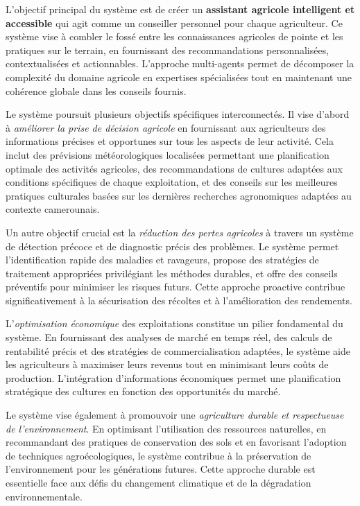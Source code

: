 L'objectif principal du système est de créer un \textbf{assistant agricole intelligent et accessible} qui agit comme un conseiller personnel pour chaque agriculteur. Ce système vise à combler le fossé entre les connaissances agricoles de pointe et les pratiques sur le terrain, en fournissant des recommandations personnalisées, contextualisées et actionnables. L'approche multi-agents permet de décomposer la complexité du domaine agricole en expertises spécialisées tout en maintenant une cohérence globale dans les conseils fournis.

Le système poursuit plusieurs objectifs spécifiques interconnectés. Il vise d'abord à \emph{améliorer la prise de décision agricole} en fournissant aux agriculteurs des informations précises et opportunes sur tous les aspects de leur activité. Cela inclut des prévisions météorologiques localisées permettant une planification optimale des activités agricoles, des recommandations de cultures adaptées aux conditions spécifiques de chaque exploitation, et des conseils sur les meilleures pratiques culturales basées sur les dernières recherches agronomiques adaptées au contexte camerounais.

Un autre objectif crucial est la \emph{réduction des pertes agricoles} à travers un système de détection précoce et de diagnostic précis des problèmes. Le système permet l'identification rapide des maladies et ravageurs, propose des stratégies de traitement appropriées privilégiant les méthodes durables, et offre des conseils préventifs pour minimiser les risques futurs. Cette approche proactive contribue significativement à la sécurisation des récoltes et à l'amélioration des rendements.

L'\emph{optimisation économique} des exploitations constitue un pilier fondamental du système. En fournissant des analyses de marché en temps réel, des calculs de rentabilité précis et des stratégies de commercialisation adaptées, le système aide les agriculteurs à maximiser leurs revenus tout en minimisant leurs coûts de production. L'intégration d'informations économiques permet une planification stratégique des cultures en fonction des opportunités du marché.

Le système vise également à promouvoir une \emph{agriculture durable et respectueuse de l'environnement}. En optimisant l'utilisation des ressources naturelles, en recommandant des pratiques de conservation des sols et en favorisant l'adoption de techniques agroécologiques, le système contribue à la préservation de l'environnement pour les générations futures. Cette approche durable est essentielle face aux défis du changement climatique et de la dégradation environnementale.

